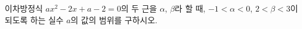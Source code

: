 이차방정식 $ax^2-2x+a-2=0$의 두 근을 $\alpha$, $\beta$라 할 때, $-1<\alpha<0$, $2<\beta<3$이 되도록 하는 실수 $a$의 값의 범위를 구하시오.
